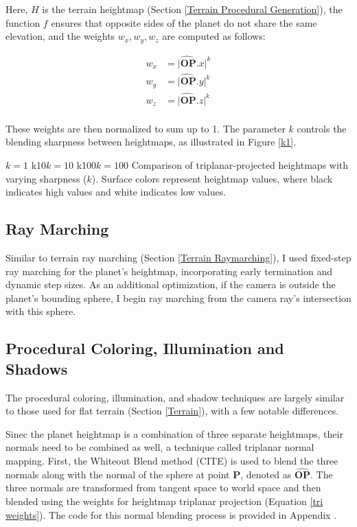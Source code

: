 Here, $H$ is the terrain heightmap (Section \ref{Terrain Procedural Generation}), the function $f$ ensures that opposite sides of the planet do not share the same elevation, and the weights $w_x,w_y,w_z$ are computed as follows:

\begin{equation}
\begin{aligned}
w_{x} &= \hat{|\mathbf{OP}}.x|^{k} \\
w_{y} &= \hat{|\mathbf{OP}}.y|^{k} \\
w_{z} &= \hat{|\mathbf{OP}}.z|^{k} \\
\label{tri weights}
\end{aligned}
\end{equation}

These weights are then normalized to sum up to 1. The parameter $k$ controls the blending sharpness between heightmaps, as illustrated in Figure \ref{k1}.


{$k=1$}
{k10}{$k=10$}
{k100}{$k=100$}
{Comparison of triplanar-projected heightmaps with varying sharpness (\( k \)). Surface colors represent heightmap values, where black indicates high values and white indicates low values.}

\subsection{Ray Marching}

Similar to terrain ray marching (Section \ref{Terrain Raymarching}), I used fixed-step ray marching for the planet's heightmap, incorporating early termination and dynamic step sizes. As an additional optimization, if the camera is outside the planet's bounding sphere, I begin ray marching from the camera ray's intersection with this sphere.

\subsection{Procedural Coloring, Illumination and Shadows}

The procedural coloring, illumination, and shadow techniques are largely similar to those used for flat terrain (Section \ref{Terrain}), with a few notable differences.

Sinec the planet heightmap is a combination of three separate heightmaps, their normals need to be combined as well, a technique called triplanar normal mapping. First, the Whiteout Blend method (CITE) is used to blend the three normals along with the normal of the sphere at point $\mathbf{P}$, denoted as $\hat{\mathbf{OP}}$. The three normals are transformed from tangent space to world space and then blended using the weights for heightmap triplanar projection (Equation \ref{tri weights}). The code for this normal blending process is provided in Appendix .


